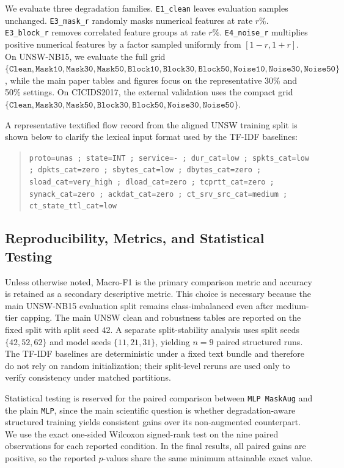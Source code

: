 We evaluate three degradation families. \texttt{E1\_clean} leaves evaluation samples unchanged. \texttt{E3\_mask\_r} randomly masks numerical features at rate $r\%$. \texttt{E3\_block\_r} removes correlated feature groups at rate $r\%$. \texttt{E4\_noise\_r} multiplies positive numerical features by a factor sampled uniformly from $[1-r,1+r]$. On UNSW-NB15, we evaluate the full grid $\{\texttt{Clean}, \texttt{Mask10}, \texttt{Mask30}, \texttt{Mask50}, \texttt{Block10}, \texttt{Block30}, \texttt{Block50}, \texttt{Noise10}, \texttt{Noise30}, \texttt{Noise50}\}$, while the main paper tables and figures focus on the representative 30\% and 50\% settings. On CICIDS2017, the external validation uses the compact grid $\{\texttt{Clean}, \texttt{Mask30}, \texttt{Mask50}, \texttt{Block30}, \texttt{Block50}, \texttt{Noise30}, \texttt{Noise50}\}$.

A representative textified flow record from the aligned UNSW training split is shown below to clarify the lexical input format used by the TF-IDF baselines:
\begin{quote}
\small
\texttt{proto=unas ; state=INT ; service=- ; dur\_cat=low ; spkts\_cat=low ; dpkts\_cat=zero ; sbytes\_cat=low ; dbytes\_cat=zero ; sload\_cat=very\_high ; dload\_cat=zero ; tcprtt\_cat=zero ; synack\_cat=zero ; ackdat\_cat=zero ; ct\_srv\_src\_cat=medium ; ct\_state\_ttl\_cat=low}
\normalsize
\end{quote}

\subsection{Reproducibility, Metrics, and Statistical Testing}
Unless otherwise noted, Macro-F1 is the primary comparison metric and accuracy is retained as a secondary descriptive metric. This choice is necessary because the main UNSW-NB15 evaluation split remains class-imbalanced even after medium-tier capping. The main UNSW clean and robustness tables are reported on the fixed split with split seed $42$. A separate split-stability analysis uses split seeds $\{42,52,62\}$ and model seeds $\{11,21,31\}$, yielding $n=9$ paired structured runs. The TF-IDF baselines are deterministic under a fixed text bundle and therefore do not rely on random initialization; their split-level reruns are used only to verify consistency under matched partitions.

Statistical testing is reserved for the paired comparison between \texttt{MLP MaskAug} and the plain \texttt{MLP}, since the main scientific question is whether degradation-aware structured training yields consistent gains over its non-augmented counterpart. We use the exact one-sided Wilcoxon signed-rank test on the nine paired observations for each reported condition. In the final results, all paired gains are positive, so the reported $p$-values share the same minimum attainable exact value.

